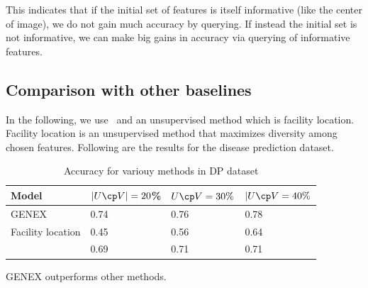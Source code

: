 \documentclass[letterpaper]{article}
\begin{document}
This indicates that if the initial set of features is itself informative (like the center of image), we do not gain much accuracy by querying. If instead the initial set is not informative, we can make big gains in accuracy via querying of informative features.

\subsection{Comparison with other baselines}

In the following, we use~\citet{xiao2022group} and an unsupervised method which is facility location. Facility location is an unsupervised method that maximizes diversity among chosen features. Following are the results for the disease prediction dataset.

\begin{table}[h]
    \centering
    \begin{tabular}{l|l|l|l}
    \hline
Model&	$|U\cp V| = 20$\% &	$U\cp V=30\%$ & 	$|U\cp V=40\%$ \\ \hline
GENEX&	0.74	&0.76	&0.78 \\ \hline
Facility location	&0.45&	0.56&	0.64  \\ \hline
\citet{xiao2022group} &	0.69&	0.71&	0.71 \\ \hline
\end{tabular}
    \caption{Accuracy for variouy methods in DP dataset}
\end{table}
GENEX outperforms other methods.



% 
% 
\end{document}
